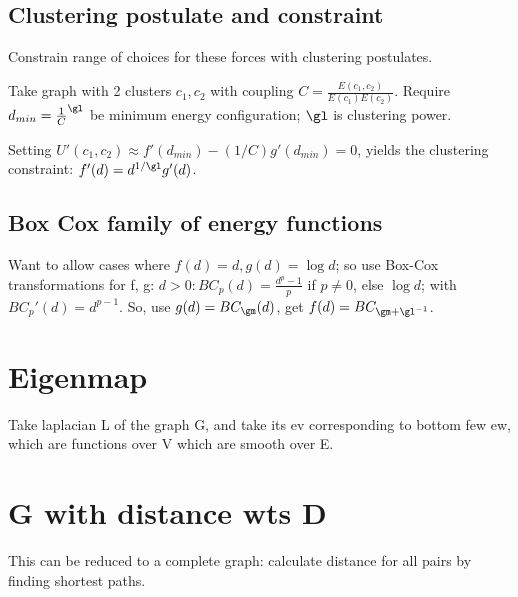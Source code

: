 \documentclass[oneside, article]{memoir}
\begin{document}
\subsection{Clustering postulate and constraint}
Constrain range of choices for these forces with clustering postulates.

Take graph with 2 clusters $c_{1}, c_{2}$ with coupling $C = \frac{E(c_{1}, c_{2})}{E(c_{1})E(c_{2})}$. Require $d_{min} = \frac{1}{C}^{\gl}$ be minimum energy configuration; $\gl$ is clustering power.

Setting $U'(c_{1}, c_{2}) \approx f'(d_{min}) - (1/C)g'(d_{min}) = 0$, yields the clustering constraint: $f'(d) = d^{1/\gl}g'(d)$.

\subsection{Box Cox family of energy functions}
Want to allow cases where $f(d) = d, g(d) = \log d$; so use Box-Cox transformations for f, g: $d>0: BC_{p}(d) = \frac{d^{p}-1}{p}$ if $p\neq 0$, else $\log d$; with $BC_{p}'(d) = d^{p-1}$. So, use $g(d) = BC_{\gm}(d)$, get $ f(d) = BC_{\gm + \gl^{-1}}$.

\section{Eigenmap}
Take laplacian L of the graph G, and take its ev corresponding to bottom few ew, which are functions over V which are smooth over E.

\section{G with distance wts D}
This can be reduced to a complete graph: calculate distance for all pairs by finding shortest paths.



\end{document}
